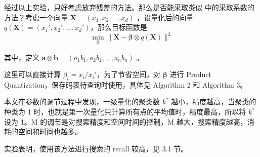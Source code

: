 \documentclass{article}
\newcommand{\tb}[1]{\textbf{#1}}
\begin{document}
经过以上实验，只好考虑放弃残差的方法。那么是否能采取类似 \cite{ref8} 中的采取系数的方法？考虑一个向量 $\tb{X} = (x_1, x_2, ..., x_d)$ ，设量化后的向量 $q(\tb{X}) = (x_1', x_2', ..., x_d')$，那么目标函数是
$$
		\mathop{\min}_{\boldsymbol{\beta}} \lVert \tb X - \boldsymbol \beta \otimes q(\tb X) \rVert ^2
$$

其中，定义 $\tb a \otimes \tb b = (a_1b_1, a_2b_2, ..., a_nb_n)$ 。

这里可以直接计算 $\beta_i = x_i / x_i'$，为了节省空间，对 $\boldsymbol{\beta}$ 进行 Product Quantization，保存码表待查询时使用，具体见 Algorithm 2 和 Algorithm 3。

本文在参数的调节过程中发现，一级量化的聚类数 $k^*$ 越小，精度越高，当聚类的种类为 1 时，也就是第一次量化只计算所有点的平均值时，精度最高，所以将 $k^*$ 设为 1。M 的调节是对搜索精度和空间时间的控制，M 越大，搜索精度越高，消耗的空间和时间也越多。

实验表明，使用该方法进行搜索的 recall 较高，见 3.1 节。
\end{document}
